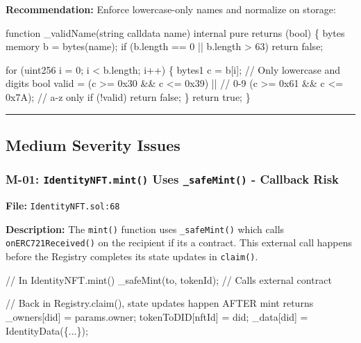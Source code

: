 \documentclass[
]{article}
\newenvironment{Shaded}{}{}
\newcommand{\NormalTok}[1]{#1}
\begin{document}
\textbf{Recommendation:} Enforce lowercase-only names and normalize on
storage:

\begin{Shaded}
\begin{Highlighting}[]
\NormalTok{function \_validName(string calldata name) internal pure returns (bool) \{}
\NormalTok{    bytes memory b = bytes(name);}
\NormalTok{    if (b.length == 0 || b.length \textgreater{} 63) return false;}

\NormalTok{    for (uint256 i = 0; i \textless{} b.length; i++) \{}
\NormalTok{        bytes1 c = b[i];}
\NormalTok{        // Only lowercase and digits}
\NormalTok{        bool valid = (c \textgreater{}= 0x30 \&\& c \textless{}= 0x39) ||  // 0{-}9}
\NormalTok{                    (c \textgreater{}= 0x61 \&\& c \textless{}= 0x7A);      // a{-}z only}
\NormalTok{        if (!valid) return false;}
\NormalTok{    \}}
\NormalTok{    return true;}
\NormalTok{\}}
\end{Highlighting}
\end{Shaded}

\begin{center}\rule{0.5\linewidth}{0.5pt}\end{center}

\subsection{Medium Severity Issues}\label{medium-severity-issues}

\subsubsection{\texorpdfstring{M-01: \texttt{IdentityNFT.mint()} Uses
\texttt{\_safeMint()} - Callback
Risk}{M-01: IdentityNFT.mint() Uses \_safeMint() - Callback Risk}}\label{m-01-identitynftmint-uses-_safemint---callback-risk}

\textbf{File:} \texttt{IdentityNFT.sol:68}

\textbf{Description:} The \texttt{mint()} function uses
\texttt{\_safeMint()} which calls \texttt{onERC721Received()} on the
recipient if it\textquotesingle s a contract. This external call happens
before the Registry completes its state updates in \texttt{claim()}.

\begin{Shaded}
\begin{Highlighting}[]
\NormalTok{// In IdentityNFT.mint()}
\NormalTok{\_safeMint(to, tokenId);  // Calls external contract}

\NormalTok{// Back in Registry.claim(), state updates happen AFTER mint returns}
\NormalTok{\_owners[did] = params.owner;}
\NormalTok{tokenToDID[nftId] = did;}
\NormalTok{\_data[did] = IdentityData(\{...\});}
\end{Highlighting}
\end{Shaded}
\end{document}
